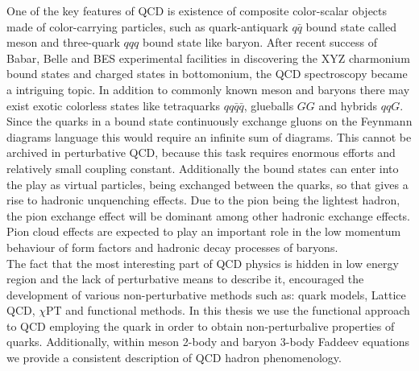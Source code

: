 
One of the key features of QCD is existence of composite color-scalar objects made of color-carrying particles, such as quark-antiquark $q \bar q$ bound state called meson and three-quark $qqq$ bound state like baryon. After recent success of Babar, Belle and BES experimental facilities in discovering the XYZ charmonium bound states and charged states in bottomonium, the QCD spectroscopy became a intriguing topic. In addition to commonly known meson and baryons there may exist exotic colorless states like tetraquarks $qq \bar q \bar q$, glueballs $GG$ and hybrids $qqG$. Since the quarks in a bound state continuously exchange gluons on the Feynmann diagrams language this would require an infinite sum of diagrams. This cannot be archived in perturbative QCD, because this task requires enormous efforts and relatively small coupling constant. Additionally the bound states can enter into the play as virtual particles, being exchanged between the quarks, so that gives a rise to hadronic unquenching effects. Due to the pion being the lightest hadron, the pion exchange effect will be dominant among other hadronic exchange effects. Pion cloud effects are expected to play an important role in the low momentum behaviour of form factors and hadronic decay processes of baryons. \\



The fact that the most interesting part of QCD physics is hidden in low energy region and the lack of perturbative means to describe it, encouraged the development of various non-perturbative methods such as: quark models, Lattice QCD, $\chi$PT and functional methods. In this thesis we use the functional approach to QCD employing the quark \DSE in order to obtain non-perturbalive properties of quarks. Additionally, within meson 2-body \BSE and baryon 3-body Faddeev equations we provide a consistent description of QCD hadron phenomenology. \\ 


